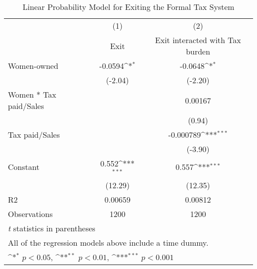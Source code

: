 \begin{table}[htbp]\centering
\def\sym#1{\ifmmode^{#1}\else\(^{#1}\)\fi}
\caption{Linear Probability Model for Exiting the Formal Tax System}
\begin{tabular}{l*{2}{c}}
\hline\hline
            &\multicolumn{1}{c}{(1)}&\multicolumn{1}{c}{(2)}\\
            &\multicolumn{1}{c}{Exit}&\multicolumn{1}{c}{Exit interacted with Tax burden}\\
\hline
Women-owned &     -0.0594\sym{*}  &     -0.0648\sym{*}  \\
            &     (-2.04)         &     (-2.20)         \\
[1em]
Women * Tax paid/Sales&                     &     0.00167         \\
            &                     &      (0.94)         \\
[1em]
Tax paid/Sales&                     &   -0.000789\sym{***}\\
            &                     &     (-3.90)         \\
[1em]
Constant    &       0.552\sym{***}&       0.557\sym{***}\\
            &     (12.29)         &     (12.35)         \\
\hline
R2          &     0.00659         &     0.00812         \\
Observations&        1200         &        1200         \\
\hline\hline
\multicolumn{3}{l}{\footnotesize \textit{t} statistics in parentheses}\\
\multicolumn{3}{l}{\footnotesize All of the regression models above include a time dummy.}\\
\multicolumn{3}{l}{\footnotesize \sym{*} \(p<0.05\), \sym{**} \(p<0.01\), \sym{***} \(p<0.001\)}\\
\end{tabular}
\end{table}

